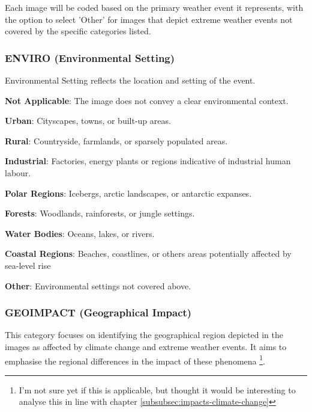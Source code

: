 Each image will be coded based on the primary weather event it represents, with the option to select 'Other' for images that depict extreme weather events not covered by the specific categories listed.

\subsubsection*{ENVIRO (Environmental Setting)}
\label{subsubsec:environmental-setting}
Environmental Setting reflects the location and setting of the event.
\begin{description}[leftmargin=2.5cm, style=multiline, labelwidth=1.5cm]
\item[0] \textbf{Not Applicable}: The image does not convey a clear environmental context.
\item[1] \textbf{Urban}: Cityscapes, towns, or built-up areas.
\item[2] \textbf{Rural}: Countryside, farmlands, or sparsely populated areas.
\item[3] \textbf{Industrial}: Factories, energy plants or regions indicative of industrial human labour.
\item[4] \textbf{Polar Regions}: Icebergs, arctic landscapes, or antarctic expanses.
\item[5] \textbf{Forests}: Woodlands, rainforests, or jungle settings.
\item[6] \textbf{Water Bodies}: Oceans, lakes, or rivers.
\item[7] \textbf{Coastal Regions}: Beaches, coastlines, or others areas potentially affected by sea-level rise
\item[8] \textbf{Other}: Environmental settings not covered above.
\end{description}

\subsubsection*{GEOIMPACT (Geographical Impact)}
\label{subsubsec:geographical-impact}
This category focuses on identifying the geographical region depicted in the images as affected by climate change and extreme weather events. It aims to emphasise the regional differences in the impact of these phenomena \footnote{I'm not sure yet if this is applicable, but thought it would be interesting to analyse this in line with chapter \ref{subsubsec:impacts-climate-change}}.

